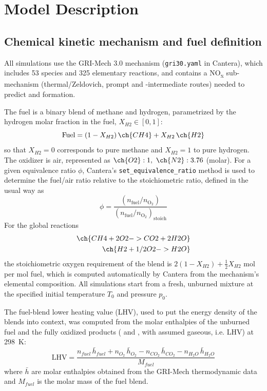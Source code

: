 \documentclass[11pt,a4paper]{article}
\begin{document}
\section{Model Description}

\subsection{Chemical kinetic mechanism and fuel definition}

All simulations use the GRI-Mech 3.0 mechanism \cite{gri30} (\texttt{gri30.yaml} in Cantera), which includes 53
species and 325 elementary reactions, and contains a NO\textsubscript{x} sub-mechanism (thermal/Zeldovich, prompt and
-intermediate routes) needed to predict  and  formation.

The fuel is a binary blend of methane and hydrogen, parametrized by the hydrogen molar fraction in the fuel,
$X_{H2} \in [0,1]$:
\begin{equation}
    \text{Fuel} = (1-X_{H2})\,\ch{CH4} + X_{H2}\,\ch{H2}
\end{equation}
so that $X_{H2}=0$ corresponds to pure methane and $X_{H2}=1$ to pure hydrogen. The oxidizer is air, represented as
$\ch{O2}:1,\ \ch{N2}:3.76$ (molar). For a given equivalence ratio $\phi$, Cantera's
\texttt{set\_equivalence\_ratio} method is used to determine the fuel/air ratio relative to the stoichiometric
ratio, defined in the usual way as
\begin{equation}
    \phi = \frac{(n_{\text{fuel}}/n_{\text{O}_2})}{(n_{\text{fuel}}/n_{\text{O}_2})_{\text{stoich}}}
\end{equation}
For the global reactions
\begin{align}
    \ch{CH4 + 2 O2 -> CO2 + 2 H2O} \\
    \ch{H2 + 1/2O2 -> H2O}
\end{align}
the stoichiometric oxygen requirement of the blend is $2(1-X_{H2}) + \tfrac{1}{2}X_{H2}$ mol  per mol fuel,
which is computed automatically by Cantera from the mechanism's elemental composition. All simulations start from a
fresh, unburned mixture at the specified initial temperature $T_0$ and pressure $p_0$.

The fuel-blend lower heating value (LHV), used to put the energy density of the blends into context, was computed
from the molar enthalpies of the unburned fuel and the fully oxidized products ( and , with
 assumed gaseous, i.e. LHV) at \SI{298}{K}:
\begin{equation}
    \text{LHV} = \frac{ n_{fuel}\,\bar{h}_{fuel} + n_{O_2}\,\bar{h}_{O_2} - n_{CO_2}\,\bar{h}_{CO_2} - n_{H_2O}\,\bar{h}_{H_2O} }{M_{fuel}}
\end{equation}
where $\bar{h}$ are molar enthalpies obtained from the GRI-Mech thermodynamic data and $M_{fuel}$ is the molar mass
of the fuel blend.
\end{document}
